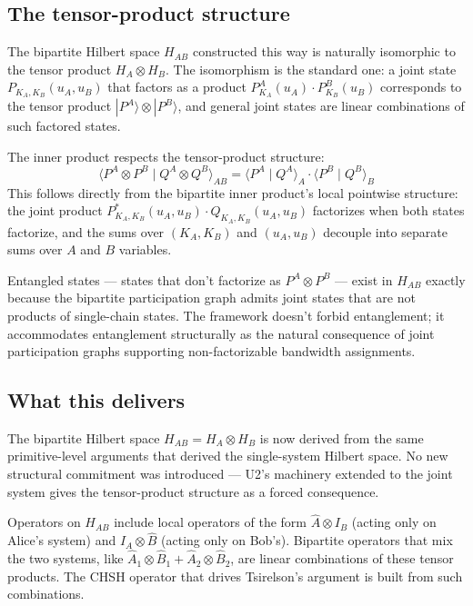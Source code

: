 \documentclass[11pt,a4paper]{article}
\begin{document}
\subsection{The tensor-product structure}

The bipartite Hilbert space $H_{AB}$ constructed this way is naturally isomorphic to the tensor product $H_A \otimes H_B$. The isomorphism is the standard one: a joint state $P_{K_A, K_B}(u_A, u_B)$ that factors as a product $P^A_{K_A}(u_A) \cdot P^B_{K_B}(u_B)$ corresponds to the tensor product $|P^A\rangle \otimes |P^B\rangle$, and general joint states are linear combinations of such factored states.

The inner product respects the tensor-product structure:
\[
\langle P^A \otimes P^B \mid Q^A \otimes Q^B \rangle_{AB} = \langle P^A \mid Q^A \rangle_A \cdot \langle P^B \mid Q^B \rangle_B
\]
This follows directly from the bipartite inner product's local pointwise structure: the joint product $P^{*}_{K_A, K_B}(u_A, u_B) \cdot Q_{K_A, K_B}(u_A, u_B)$ factorizes when both states factorize, and the sums over $(K_A, K_B)$ and $(u_A, u_B)$ decouple into separate sums over $A$ and $B$ variables.

Entangled states --- states that don't factorize as $P^A \otimes P^B$ --- exist in $H_{AB}$ exactly because the bipartite participation graph admits joint states that are not products of single-chain states. The framework doesn't forbid entanglement; it accommodates entanglement structurally as the natural consequence of joint participation graphs supporting non-factorizable bandwidth assignments.

\subsection{What this delivers}

The bipartite Hilbert space $H_{AB} = H_A \otimes H_B$ is now derived from the same primitive-level arguments that derived the single-system Hilbert space. No new structural commitment was introduced --- U2's machinery extended to the joint system gives the tensor-product structure as a forced consequence.

Operators on $H_{AB}$ include local operators of the form $\hat{A} \otimes I_B$ (acting only on Alice's system) and $I_A \otimes \hat{B}$ (acting only on Bob's). Bipartite operators that mix the two systems, like $\hat{A}_1 \otimes \hat{B}_1 + \hat{A}_2 \otimes \hat{B}_2$, are linear combinations of these tensor products. The CHSH operator that drives Tsirelson's argument is built from such combinations.
\end{document}
